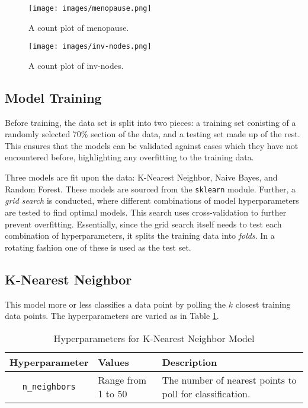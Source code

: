 \documentclass{article}
\begin{document}
\begin{figure}
	\centering
	\texttt{[image: images/menopause.png]}
	\caption{A count plot of menopause.}
	\label{fig:menopause}
\end{figure}

\begin{figure}
	\centering
	\texttt{[image: images/inv-nodes.png]}
	\caption{A count plot of inv-nodes.}
	\label{fig:inv-nodes}
\end{figure}

\subsection{Model Training}

Before training, the data set is split into two pieces: a training set conisting of a randomly selected 70\% section of the data, and a testing set made up of the rest. This ensures that the models can be validated against cases which they have not encountered before, highlighting any overfitting to the training data.

Three models are fit upon the data: K-Nearest Neighbor, Naive Bayes, and Random Forest. These models are sourced from the \verb|sklearn| module. Further, a \emph{grid search} is conducted, where different combinations of model hyperparameters are tested to find optimal models. This search uses cross-validation to further prevent overfitting. Essentially, since the grid search itself needs to test each combination of hyperparameters, it splits the training data into \emph{folds}. In a rotating fashion one of these is used as the test set.

\subsection{K-Nearest Neighbor}

This model more or less classifies a data point by polling the $k$ closest training data points. The hyperparameters are varied as in Table \ref{tbl:knn_hyp}.

\begin{table}[h!]
	\centering
	\caption{Hyperparameters for K-Nearest Neighbor Model}
	\label{tbl:knn_hyp}
	\begin{tabular}{c|p{1in}|p{3in}}
		Hyperparameter & Values & Description \\
		\hline
		\verb|n_neighbors| & Range from 1 to 50 & The number of nearest points to poll for classification.
	\end{tabular}
\end{table}
\end{document}
